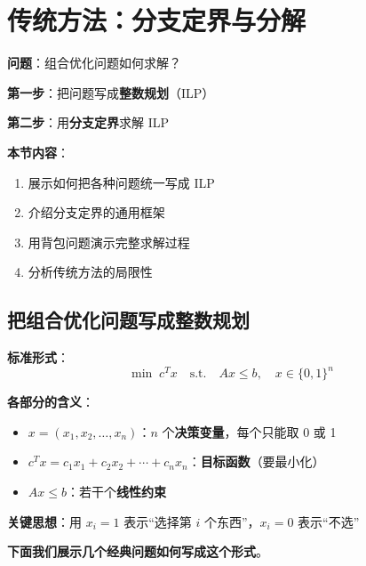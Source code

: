 \documentclass[12pt, a4paper]{ctexart}
\begin{document}
\section{传统方法：分支定界与分解}

\begin{blackboard}[本节目标]

\textbf{问题}：组合优化问题如何求解？

\textbf{第一步}：把问题写成\textbf{整数规划}（ILP）

\textbf{第二步}：用\textbf{分支定界}求解 ILP

\textbf{本节内容}：
\begin{enumerate}
    \item 展示如何把各种问题统一写成 ILP
    \item 介绍分支定界的通用框架
    \item 用背包问题演示完整求解过程
    \item 分析传统方法的局限性
\end{enumerate}

\end{blackboard}

\subsection{把组合优化问题写成整数规划}

\begin{blackboard}

\textbf{标准形式}：
\[
\min \; c^T x \quad \text{s.t.} \quad Ax \leq b, \quad x \in \{0, 1\}^n
\]

\textbf{各部分的含义}：
\begin{itemize}
    \item $x = (x_1, x_2, \ldots, x_n)$：$n$ 个\textbf{决策变量}，每个只能取 0 或 1
    \item $c^T x = c_1 x_1 + c_2 x_2 + \cdots + c_n x_n$：\textbf{目标函数}（要最小化）
    \item $Ax \leq b$：若干个\textbf{线性约束}
\end{itemize}

\textbf{关键思想}：用 $x_i = 1$ 表示``选择第 $i$ 个东西''，$x_i = 0$ 表示``不选''

\textbf{下面我们展示几个经典问题如何写成这个形式}。

\end{blackboard}
\end{document}
